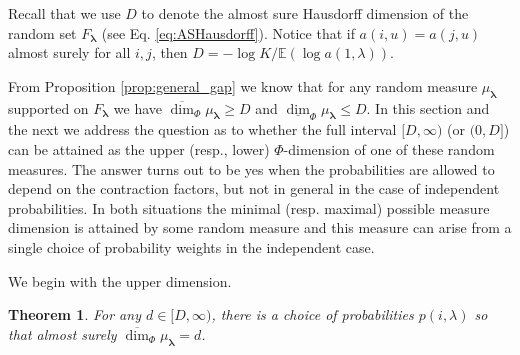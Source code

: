\documentclass{amsart}
\newtheorem{theorem}{Theorem}
\theoremstyle{plain}
\numberwithin{equation}{section}
\newcommand{\blambda}{{\boldsymbol{\lambda}}}
\newcommand{\ee}{{\mathbb E}}
\newcommand{\odim}{\overline{\dim}}
\newcommand{\udim}{\underline{\dim}}
\begin{document}
\medskip

Recall that we use $D$ to denote the almost sure Hausdorff dimension of the random set $F_\blambda$ (see Eq. \ref{eq:ASHausdorff}).
Notice that if $a(i,u) = a(j,u)$ almost surely for all $i,j$, then $D = -\log K/\ee(\log a(1,\lambda))$.

From Proposition \ref{prop:general_gap} we know that for any random measure $\mu_\blambda$ supported on $F_\blambda$ we have 
$\odim_{\Phi}\mu_\blambda\geq D$ and $\udim_{\Phi}\mu_\blambda\leq D$. 
In this section and the next we address the question as to whether the full interval $[D,\infty)$ (or $(0,D]$) can be attained as the
upper (resp., lower) $\Phi$-dimension of one of these random measures. 
The answer turns out to be yes when the probabilities are allowed to depend on the contraction factors, but not in general in the case of independent probabilities. 
In both situations the minimal (resp. maximal) possible measure dimension is attained by some random measure and this measure can arise from a single choice of probability weights in the independent case.


We begin with the upper dimension.

\begin{theorem} \label{thm:upper_dependent}
For any $d \in [D, \infty)$, there is a choice of probabilities $p(i,\lambda)$ so
that almost surely $\odim_\Phi \mu_\blambda = d$.
\end{theorem}
\end{document}
